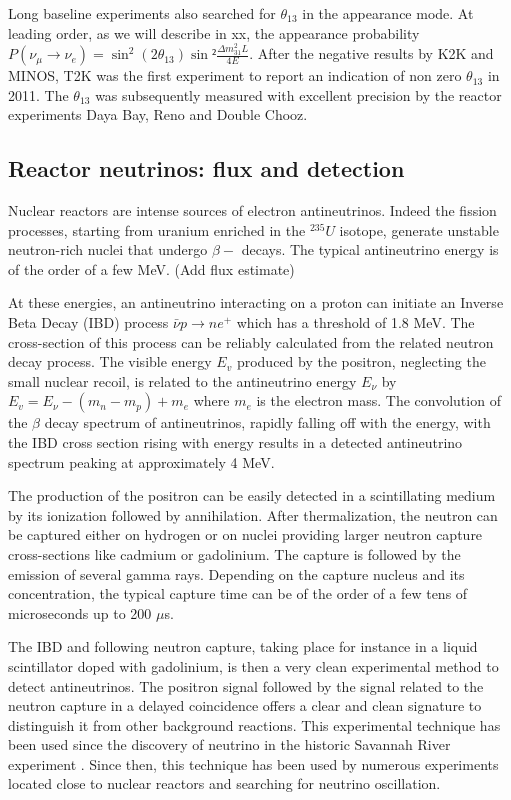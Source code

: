 Long baseline experiments also searched for $\theta_{13}$ in the appearance mode. At leading order, as we will describe in xx, the appearance probability $P(\nu_\mu \rightarrow \nu_e) = \sin^2 (2 \theta_13) \sin² \frac {\Delta m^2_{31} L}{4E}$. After the negative results by K2K and MINOS, T2K was the first experiment to report an indication of non zero $\theta_{13}$ in 2011. The $\theta_{13}$ was subsequently measured with excellent precision by the reactor experiments Daya Bay, Reno and Double Chooz.


\subsection{Reactor neutrinos: flux and detection}
\label{subsec:reactorflux}
Nuclear reactors are intense sources of electron antineutrinos. Indeed the fission processes, starting from uranium enriched in the $^{235}U$ isotope, generate unstable neutron-rich nuclei that undergo $\beta -$ decays. The typical antineutrino energy is of the order of a few MeV. (Add flux estimate)

At these energies, an antineutrino interacting on a proton can initiate an Inverse Beta Decay (IBD) process $\bar{\nu} p \rightarrow n e^+$ which has a threshold of 1.8 MeV. The cross-section of this process can be reliably calculated from the related neutron decay process. The visible energy $E_v$ produced by the positron, neglecting the small nuclear recoil, is related to the antineutrino energy $E_\nu$ by $E_v =  E_{\nu} -(m_n - m_p) + m_e$ where $m_e$ is the electron mass. The convolution of the $\beta$ decay spectrum of antineutrinos, rapidly falling off with the energy, with the IBD cross section rising with energy results in a detected antineutrino spectrum peaking at approximately 4 MeV. 

The production of the positron can be easily detected in a scintillating medium by its ionization followed by annihilation. After thermalization, the neutron can be captured either on hydrogen or on nuclei providing larger neutron capture cross-sections like cadmium or gadolinium. The capture is followed by the emission of several gamma rays. Depending on the capture nucleus and its concentration, the typical capture time can be of the order of a few tens of microseconds up to 200 $\mu $s.

The IBD and following neutron capture, taking place for instance in a liquid scintillator doped with gadolinium, is then a very clean experimental method to detect antineutrinos. The positron signal followed by the signal related to the neutron capture in a delayed coincidence offers a clear and clean signature to distinguish it from other background reactions. This experimental technique has been used since the discovery of neutrino in the historic Savannah River experiment \cite{reines56}. Since then, this technique has been used by numerous experiments located close to nuclear reactors and searching for neutrino oscillation.

